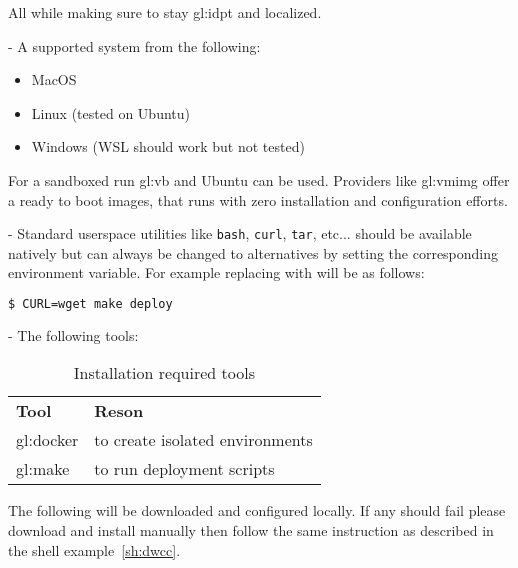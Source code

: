 All while making sure to stay \gls{gl:idpt} and localized.


- A supported system from the following:

\begin{itemize}
  \item MacOS
  \item Linux (tested on Ubuntu)
  \item Windows (WSL should work but not tested)
\end{itemize}

For a sandboxed run \gls{gl:vb} and Ubuntu can be used. Providers like \gls{gl:vmimg} offer a ready to boot images, that runs with zero installation and configuration efforts.

- Standard userspace utilities like \lstinline[columns=fixed]{bash}, \lstinline[columns=fixed]{curl}, \lstinline[columns=fixed]{tar}, etc... should be available natively but can always be changed to alternatives by setting the corresponding environment variable. For example replacing  with  will be as follows:

\begin{lstlisting}[language=bash, caption={Deploy with custom command}, label={sh:dwcc}]
    $ CURL=wget make deploy
\end{lstlisting}

- The following tools:

\begin{table}[H]
  \begin{center}
    \label{tab:irt}
    \def\arraystretch{1.5}
    \begin{tabularx}{\linewidth}{|l X |}
      \hline
      \rowcolor{gray!20}
      \textbf{Tool} & \textbf{Reson}\\
      \gls{gl:docker} & to create isolated environments\\
      \gls{gl:make} & to run deployment scripts\\
      \hline
    \end{tabularx}
    \caption{Installation required tools}
  \end{center}
\end{table}

\label{hdr:auto}

The following will be downloaded and configured locally. If any should fail please download and install manually then follow the same instruction as described in the shell example~\ref{sh:dwcc}.

